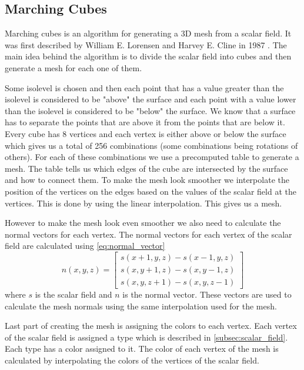 \subsection*{Marching Cubes} \label{subsec:marching_cubes}
Marching cubes is an algorithm for generating a 3D mesh from a scalar field.
It was first described by William E. Lorensen and Harvey E. Cline in 1987 \cite{marching_cubes}.
The main idea behind the algorithm is to divide the scalar field into cubes and then generate a mesh for each one of them.

Some isolevel is chosen and then each point that has a value greater than the isolevel is considered to be "above" the surface and each point with a value lower than the isolevel is considered to be "below" the surface.
We know that a surface has to separate the points that are above it from the points that are below it.
Every cube has 8 vertices and each vertex is either above or below the surface which gives us a total of 256 combinations (some combinations being rotations of others).
For each of these combinations we use a precomputed table to generate a mesh.
The table tells us which edges of the cube are intersected by the surface and how to connect them.
To make the mesh look smoother we interpolate the position of the vertices on the edges based on the values of the scalar field at the vertices.
This is done by using the linear interpolation. %
This gives us a mesh.

However to make the mesh look even smoother we also need to calculate the normal vectors for each vertex.
The normal vectors for each vertex of the scalar field are calculated using \autoref*{eq:normal_vector}
\begin{equation}
    \label{eq:normal_vector}
    n(x, y, z) = \begin{bmatrix}
        s(x + 1, y, z) - s(x - 1, y, z) \\
        s(x, y + 1, z) - s(x, y - 1, z) \\
        s(x, y, z + 1) - s(x, y, z - 1)
      \end{bmatrix}
\end{equation}
where $s$ is the scalar field and $n$ is the normal vector.
These vectors are used to calculate the mesh normals using the same interpolation used for the mesh.

Last part of creating the mesh is assigning the colors to each vertex.
Each vertex of the scalar field is assigned a type which is described in \autoref*{subsec:scalar_field}.
Each type has a color assigned to it.
The color of each vertex of the mesh is calculated by interpolating the colors of the vertices of the scalar field.

